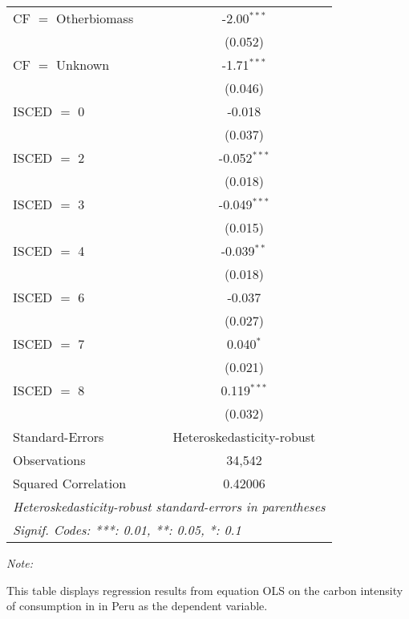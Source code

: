 \begin{table}[htbp!]
\begin{adjustbox}{width = 1\textwidth, max height = 0.95\textheight, center}
\begin{threeparttable}[b]
\begin{tabular}{lc}
            CF $=$ Otherbiomass & -2.00$^{***}$\\   
                                & (0.052)\\   
            CF $=$ Unknown      & -1.71$^{***}$\\   
                                & (0.046)\\   
            ISCED $=$ 0         & -0.018\\   
                                & (0.037)\\   
            ISCED $=$ 2         & -0.052$^{***}$\\   
                                & (0.018)\\   
            ISCED $=$ 3         & -0.049$^{***}$\\   
                                & (0.015)\\   
            ISCED $=$ 4         & -0.039$^{**}$\\   
                                & (0.018)\\   
            ISCED $=$ 6         & -0.037\\   
                                & (0.027)\\   
            ISCED $=$ 7         & 0.040$^{*}$\\   
                                & (0.021)\\   
            ISCED $=$ 8         & 0.119$^{***}$\\   
                                & (0.032)\\   
            \midrule 
            Standard-Errors     & Heteroskedasticity-robust \\   
            Observations        & 34,542\\  
            Squared Correlation & 0.42006\\  
            \midrule \midrule
            \multicolumn{2}{l}{\emph{Heteroskedasticity-robust standard-errors in parentheses}}\\
            \multicolumn{2}{l}{\emph{Signif. Codes: ***: 0.01, **: 0.05, *: 0.1}}\\
         \end{tabular}
         
         \begin{tablenotes}\item \medskip \textit{Note:}
            \item This table displays regression results from equation OLS on the carbon intensity of consumption in  in Peru as the dependent variable. 
         \end{tablenotes}
      \end{threeparttable}
   \end{adjustbox}
\end{table}


